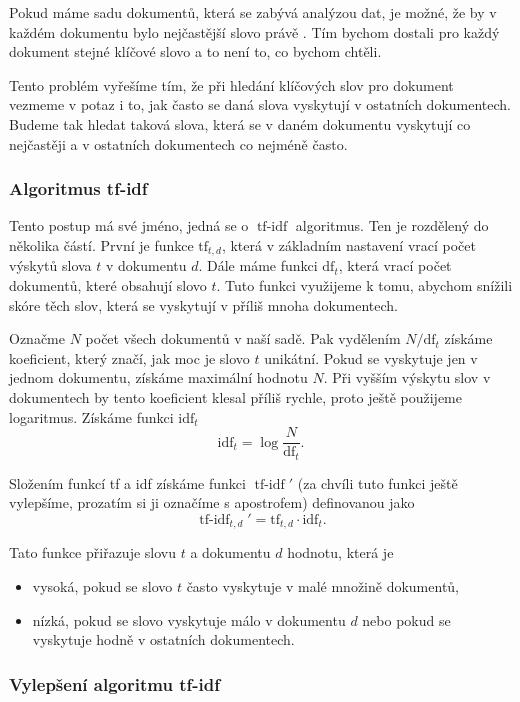 \documentclass[12pt]{article}
\DeclareMathOperator{\tfidf}{tf-idf}
\begin{document}
Pokud máme sadu dokumentů, která se zabývá analýzou dat, je možné, že by v každém dokumentu bylo nejčastější slovo právě . Tím bychom dostali pro každý dokument stejné klíčové slovo a to není to, co bychom chtěli. 

Tento problém vyřešíme tím, že při hledání klíčových slov pro dokument vezmeme v potaz i to, jak často se daná slova vyskytují v ostatních dokumentech. Budeme tak hledat taková slova, která se v daném dokumentu vyskytují co nejčastěji a v ostatních dokumentech co nejméně často. 


\subsubsection{Algoritmus tf-idf}\label{tfidf}
Tento postup má své jméno, jedná se o $\tfidf$ algoritmus. Ten je rozdělený do několika částí. První je funkce $\mbox{tf}_{t,d}$, která v základním nastavení vrací počet výskytů slova $t$ v dokumentu $d$. Dále máme funkci $\mbox{df}_t$, která vrací počet dokumentů, které obsahují slovo $t$. Tuto funkci využijeme k tomu, abychom snížili skóre těch slov, která se vyskytují v příliš mnoha dokumentech. 

Označme $N$ počet všech dokumentů v naší sadě. Pak vydělením $N/\mbox{df}_t$ získáme koeficient, který značí, jak moc je slovo $t$ unikátní. Pokud se vyskytuje jen v jednom dokumentu, získáme maximální hodnotu $N$. Při vyšším výskytu slov v dokumentech by tento koeficient klesal příliš rychle, proto ještě použijeme logaritmus. Získáme funkci $\mbox{idf}_t$
$$\mbox{idf}_t=\log\frac{N}{\mbox{df}_t}.$$

Složením funkcí tf a idf získáme funkci $\tfidf'$ (za chvíli tuto funkci ještě vylepšíme, prozatím si ji označíme s apostrofem) definovanou jako
$$\tfidf_{t,d}'=\mbox{tf}_{t,d}\cdot\mbox{idf}_t.$$

Tato funkce přiřazuje slovu $t$ a dokumentu $d$ hodnotu, která je

\begin{itemize}
\item vysoká, pokud se slovo $t$ často vyskytuje v malé množině dokumentů,
\item nízká, pokud se slovo vyskytuje málo v dokumentu $d$ nebo pokud se vyskytuje hodně v ostatních dokumentech.
\end{itemize}

\subsubsection{Vylepšení algoritmu tf-idf}
\end{document}
